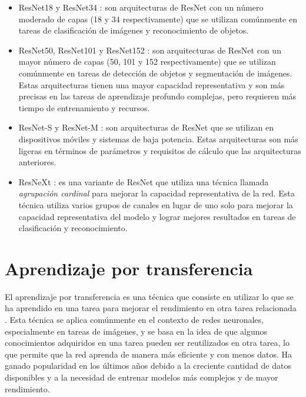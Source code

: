 \begin{itemize}
  \item ResNet18 y ResNet34 \parencite{he2016deep}: son arquitecturas de ResNet con un número moderado de capas (18 y 34 respectivamente) que se
        utilizan comúnmente en tareas de clasificación de imágenes y reconocimiento de objetos.
  \item ResNet50, ResNet101 y ResNet152 \parencite{he2016deep}: son arquitecturas de ResNet con un mayor número de capas (50, 101 y 152 respectivamente) que se
        utilizan comúnmente en tareas de detección de objetos y segmentación de imágenes. Estas arquitecturas tienen una mayor
        capacidad representativa y son más precisas en las tareas de aprendizaje profundo complejas, pero requieren más tiempo
        de entrenamiento y recursos.
  \item ResNet-S y ResNet-M \parencite{sandler2018mobilenetv2}: son arquitecturas de ResNet que se utilizan en dispositivos móviles y sistemas de baja
        potencia. Estas arquitecturas son más ligeras en términos de parámetros y requisitos de cálculo que las arquitecturas
        anteriores.
  \item ResNeXt \parencite{xie2017aggregated}: es una variante de ResNet que utiliza una técnica llamada {\it agrupación cardinal} para
        mejorar la capacidad representativa de la red. Esta técnica utiliza varios grupos de canales en lugar de uno solo para
        mejorar la capacidad representativa del modelo y lograr mejores resultados en tareas de clasificación y reconocimiento.
\end{itemize}

\section{Aprendizaje por transferencia}

El aprendizaje por transferencia es una técnica que consiste en utilizar lo que se ha aprendido en una tarea para
mejorar el rendimiento en otra tarea relacionada \parencite{thrun1998learning}. Esta técnica se aplica comúnmente en el contexto de redes neuronales, especialmente en
tareas de imágenes, y se basa en la idea de que algunos conocimientos adquiridos en una tarea pueden ser reutilizados
en otra tarea, lo que permite que la red aprenda de manera más eficiente y con menos datos. Ha ganado popularidad en
los últimos años debido a la creciente cantidad de datos disponibles y a la necesidad de entrenar modelos más complejos
y de mayor rendimiento.

